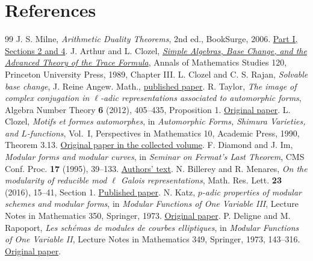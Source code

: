 \documentclass[a4paper,11pt]{article}
\theoremstyle{definition}
\theoremstyle{remark}
\numberwithin{equation}{section}
\begin{document}
\clearpage
\section{References}\label{nav:bibliography-VII}
\begingroup{}\begin{thebibliography}{99}\small
{} J. S. Milne, \emph{Arithmetic Duality Theorems}, 2nd ed., BookSurge, 2006. \href{https://www.jmilne.org/math/Books/ADTnot.pdf}{Part I, Sections 2 and 4}.
 J. Arthur and L. Clozel, \href{https://www.claymath.org/library/cw/arthur/pdf/30.pdf}{\emph{Simple Algebras, Base Change, and the Advanced Theory of the Trace Formula}}, Annals of Mathematics Studies 120, Princeton University Press, 1989, Chapter III.
 L. Clozel and C. S. Rajan, \emph{Solvable base change}, J. Reine Angew. Math., \href{https://doi.org/10.1515/crelle-2020-0023}{published paper}.
 R. Taylor, \emph{The image of complex conjugation in \(\ell\)-adic representations associated to automorphic forms}, Algebra Number Theory \textbf{6} (2012), 405--435, Proposition 1. \href{https://msp.org/ant/2012/6-3/ant-v6-n3-p01-p.pdf}{Original paper}.
 L. Clozel, \emph{Motifs et formes automorphes}, in \emph{Automorphic Forms, Shimura Varieties, and \(L\)-functions}, Vol.~I, Perspectives in Mathematics 10, Academic Press, 1990, Theorem 3.13. \href{https://www.jmilne.org/math/Books/AA1988a.pdf}{Original paper in the collected volume}.
 F. Diamond and J. Im, \emph{Modular forms and modular curves}, in \emph{Seminar on Fermat's Last Theorem}, CMS Conf. Proc. \textbf{17} (1995), 39--133. \href{https://wstein.org/edu/Fall2003/252/references/diamond-im/Diamond-Im-Modular_forms_and_modular_curves.pdf}{Authors' text}.
 N. Billerey and R. Menares, \emph{On the modularity of reducible mod \(\ell\) Galois representations}, Math. Res. Lett. \textbf{23} (2016), 15--41, Section 1. \href{https://lmbp.uca.fr/~billerey/Research/Published/Menares_Modularity.pdf}{Published paper}.
 N. Katz, \emph{\(p\)-adic properties of modular schemes and modular forms}, in \emph{Modular Functions of One Variable III}, Lecture Notes in Mathematics 350, Springer, 1973. \href{https://web.math.princeton.edu/~nmk/old/padicpropMFMS.pdf}{Original paper}.
 P. Deligne and M. Rapoport, \emph{Les sch\'emas de modules de courbes elliptiques}, in \emph{Modular Functions of One Variable II}, Lecture Notes in Mathematics 349, Springer, 1973, 143--316. \href{https://publications.ias.edu/book/export/html/367}{Original paper}.

\end{thebibliography}
\end{document}

